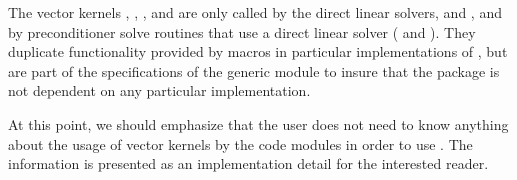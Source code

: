 The vector kernels , , , and
 are only called by the {\cvodes} direct linear solvers, 
{\cvdense} and {\cvband}, and by preconditioner solve routines that use a 
direct linear solver ({\cvbandpre}  and {\cvbbdpre}). They duplicate 
functionality provided by macros in particular implementations of {\nvector},
but are part of the specifications of the generic {\nvector} module to insure 
that the {\cvodes} package is not dependent on any particular {\nvector} implementation.

At this point, we should emphasize that the {\cvodes} user does not need to know 
anything about the usage of vector kernels by the {\cvodes} code modules in order 
to use {\cvodes}. The information is presented as an implementation detail for the 
interested reader.

